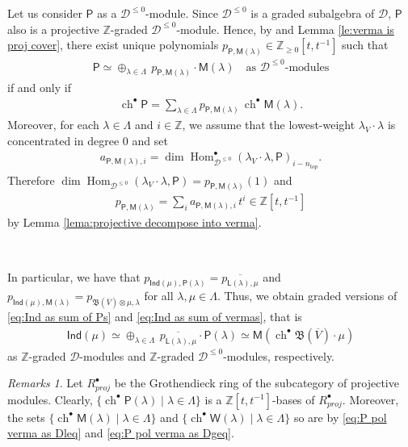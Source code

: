\documentclass[reqno]{amsart}
\newcommand{\oV}{\overline{V}}
\renewcommand{\_}[1]{_{\left( #1 \right)}}
\renewcommand{\^}[1]{^{\left( #1 \right)}}
\newcommand{\ot}{{\otimes}}
\newcommand\fInd{\mathsf{Ind}}
\newcommand\fL{\mathsf{L}}
\newcommand\fM{\mathsf{M}}
\newcommand\fP{\mathsf{P}}
\newcommand\fW{\mathsf{W}}
\newcommand{\Z}{{\mathbb Z}}
\newcommand{\D}{\mathcal{D}}
\newcommand{\BV}{{\mathfrak B}}
\newcommand{\chgr}{\operatorname{ch}^{\bullet}}
\newcommand\Hom{\operatorname{Hom}}
\theoremstyle{plain}
\theoremstyle{definition}
\theoremstyle{remark}
\newtheorem{rmk}[lema]{Remarks}
\begin{document}
Let us consider $\fP$ as a $\D^{\leq0}$-module. Since $\D^{\leq0}$ is a graded subalgebra of $\D$, $\fP$ also is a projective $\Z$-graded $\D^{\leq0}$-module. Hence, by \cite[Proposition 5.8 (iii)]{MR659212} and Lemma \ref{le:verma is proj cover}, there exist unique polynomials 
$p_{\fP,\fM(\lambda)}\in\Z_{\geq0}[t,t^{-1}]$ such that
\begin{align}\label{eq:P pol verma as Dleq}
\fP\simeq\oplus_{\lambda\in\Lambda}\,p_{\fP,\fM(\lambda)}\cdot\fM(\lambda)\quad\mbox{as $\D^{\leq0}$-modules}
\end{align}
if and only if
\begin{align}
\chgr\fP=\sum_{\lambda\in\Lambda}p_{\fP,\fM(\lambda)}\,\chgr\fM(\lambda).
\end{align}
Moreover, for each $\lambda\in\Lambda$ and $i\in\Z$, we assume that the lowest-weight $\lambda_V\cdot\lambda$ is concentrated in degree $0$ and set
\begin{align}\label{eq:definition of a fP fMlambda i}
a_{\fP,\fM(\lambda),i}=\dim\Hom_{\D^{\leq0}}^{\bullet}(\lambda_V\cdot\lambda,\fP)_{i-n_{top}}.
\end{align}
Therefore $\dim\Hom_{\D^{\leq0}}(\lambda_V\cdot\lambda,\fP)=p_{\fP,\fM(\lambda)}(1)$ and
\begin{align}\label{eq:def of p fP fMlambda i}
p_{\fP,\fM(\lambda)}=\sum_{i}a_{\fP,\fM(\lambda),i}\,t^i\in\Z[t,t^{-1}]
\end{align}
by Lemma \ref{lema:projective decompose into verma}. 

\

In particular, we have that $p_{\fInd(\mu),\fP(\lambda)}=\overline{p_{\fL(\lambda),\mu}}$ and  $p_{\fInd(\mu),\fM(\lambda)}=p_{\BV(\oV)\ot\mu,\lambda}$ for all $\lambda,\mu\in\Lambda$. Thus, we obtain graded versions of \eqref{eq:Ind as sum of Ps} and \eqref{eq:Ind as sum of vermas}, that is
\begin{align}
\fInd(\mu)\simeq\oplus_{\lambda\in\Lambda}\,\overline{p_{\fL(\lambda),\mu}}\cdot\fP(\lambda)\simeq\fM(\chgr\BV(\oV)\cdot\mu)
\end{align}
as $\Z$-graded $\D$-modules and $\Z$-graded $\D^{\leq0}$-modules, respectively.

\begin{rmk}
Let $R^\bullet_{proj}$ be the Grothendieck ring of the subcategory of projective modules. Clearly, $\{\chgr\fP(\lambda)\mid\lambda\in\Lambda\}$ is a $\Z[t,t^{-1}]$-bases of 
$R^\bullet_{proj}$. Moreover, the sets $\{\chgr\fM(\lambda)\mid\lambda\in\Lambda\}$ and $\{\chgr\fW(\lambda)\mid\lambda\in\Lambda\}$ so are by \eqref{eq:P pol verma as Dleq} and \eqref{eq:P 
pol verma as Dgeq}.  
\end{rmk}
\end{document}
